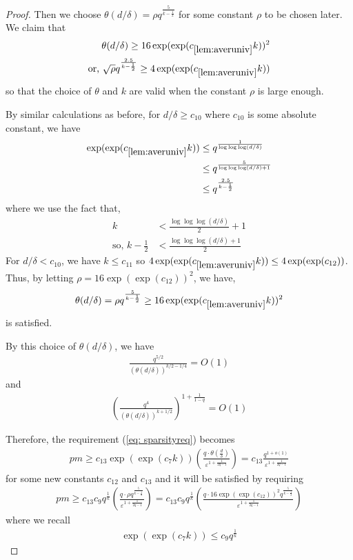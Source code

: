 \documentclass[11pt]{amsart}
\numberwithin{equation}{section}
\numberwithin{equation}{section}
\begin{document}
\begin{proof}
Then we choose $\theta(d/\delta)=\rho q^{\frac{5}{k-\frac{1}{2}}}$ for some constant $\rho$ to be chosen later. We claim that
\begin{align*}
    \theta(d/\delta) \ge 16\exp(\exp(c_{\ref{lem:averuniv}}k))^2 \\
    \text{or, } \sqrt{\rho} q^{\frac{2.5}{k-\frac{1}{2}}} \ge 4 \exp(\exp(c_{\ref{lem:averuniv}}k)) 
\end{align*}
so that the choice of $\theta$ and $k$ are valid when the constant $\rho$ is large enough.

By similar calculations as before, for $d/\delta \ge c_{10}$ where $c_{10}$ is some absolute constant, we have
\begin{align*}  {\exp(\exp(c_{\ref{lem:averuniv}}k))} &\le q^{\frac{1}{\log\log\log(d/\delta)}} \\
&\le  q^{\frac{5}{\log\log\log(d/\delta) + 1}} \\
&\le  q^{\frac{2.5}{k-\frac{1}{2}}}
\end{align*}
where we use the fact that, 
\begin{align*}
    k &< \frac{\log\log\log (d/\delta)}{2}+1 \\
    \text{so, } k - \frac{1}{2} &< \frac{\log\log\log (d/\delta) + 1}{2}
\end{align*}
For $d/\delta < c_{10}$, we have $k \le c_{11}$ so $4 \exp(\exp(c_{\ref{lem:averuniv}}k)) \le 4 \exp(\exp(c_{12})) $. Thus, by letting $\rho =  16\exp(\exp(c_{12}))^2$, we have, 
\begin{align*}
    \theta(d/\delta)= \rho q^{\frac{5}{k-\frac{1}{2}}}\ge 16\exp(\exp(c_{\ref{lem:averuniv}}k))^2
\end{align*}
is satisfied.



By this choice of $\theta(d/\delta)$, we have
\begin{align*}
    \frac{q^{5/2}}{(\theta(d/\delta))^{k/2-1/4}}=O(1)
\end{align*}
and
\begin{align*}
    (\frac{ q^{4}}{(\theta(d/\delta))^{k+1/2}})^{1+\frac{1}{1-q}}=O(1)
\end{align*}

Therefore, the requirement (\ref{eq: sparsityreq}) becomes
\begin{align*}
    {pm } \ge c_{13}{\exp(\exp(c_{7}k))}\left(\frac{q \cdot \theta(\frac{d}{\delta})}{\varepsilon^{1+\frac{1}{2q-1}}}\right) = c_{13} \frac{q^{1+o(1)}}{\varepsilon^{1+\frac{1}{2q-1}}}
\end{align*}
for some new constants $c_{12}$ and $c_{13}$ and it will be satisfied by requiring
\begin{align*}
    pm \ge c_{13} c_9q^{\frac{1}{k}}\left(\frac{q \cdot \rho q^{\frac{5}{k-\frac{1}{2}}}}{\varepsilon^{1+\frac{1}{2q-1}}}\right) =c_{13} c_9q^{\frac{1}{k}}\left(\frac{q \cdot 16\exp(\exp(c_{12}))^2 q^{\frac{5}{k-\frac{1}{2}}}}{\varepsilon^{1+\frac{1}{2q-1}}}\right) 
\end{align*}
where we recall
\begin{align*}  {\exp(\exp(c_7k))} \le c_9q^{\frac{1}{k}} 
\end{align*}



\end{proof}
\end{document}

